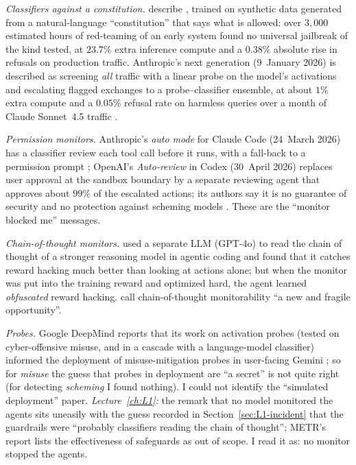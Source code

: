 \begin{beyond}\label{box:L6-monitors}
\emph{Classifiers against a constitution.} \citet{sharma2025} describe , trained on synthetic data generated from a natural-language ``constitution'' that says what is allowed: over $3{,}000$ estimated hours of red-teaming of an early system found no universal jailbreak of the kind tested, at $23.7\%$ extra inference compute and a $0.38\%$ absolute rise in refusals on production traffic. Anthropic's next generation (9~January 2026) is described as screening \emph{all} traffic with a linear probe on the model's activations and escalating flagged exchanges to a probe--classifier ensemble, at about $1\%$ extra compute and a $0.05\%$ refusal rate on harmless queries over a month of Claude Sonnet~4.5 traffic \citep{anthropic2026nextclf}.

\emph{Permission monitors.} Anthropic's \emph{auto mode} for Claude Code (24~March 2026) has a classifier review each tool call before it runs, with a fall-back to a permission prompt \citep{anthropic2026auto}; OpenAI's \emph{Auto-review} in Codex (30~April 2026) replaces user approval at the sandbox boundary by a separate reviewing agent that approves about $99\%$ of the escalated actions; its authors say it is no guarantee of security and no protection against scheming models \citep{trebacz2026}. These are the ``monitor blocked me'' messages.

\emph{Chain-of-thought monitors.} \citet{baker2025} used a separate LLM (GPT-4o) to read the chain of thought of a stronger reasoning model in agentic coding and found that it catches reward hacking much better than looking at actions alone; but when the monitor was put into the training reward and optimized hard, the agent learned \emph{obfuscated} reward hacking. \citet{korbak2025} call chain-of-thought monitorability ``a new and fragile opportunity''.

\emph{Probes.} Google DeepMind reports that its work on activation probes (tested on cyber-offensive misuse, and in a cascade with a language-model classifier) informed the deployment of misuse-mitigation probes in user-facing Gemini \citep{kramar2026}; so for \emph{misuse} the guess that probes in deployment are ``a secret'' is not quite right (for detecting \emph{scheming} I found nothing). I could not identify the ``simulated deployment'' paper. \emph{Lecture~\ref{ch:L1}:} the remark that no model monitored the agents sits uneasily with the guess recorded in Section~\ref{sec:L1-incident} that the guardrails were ``probably classifiers reading the chain of thought''; METR's report lists the effectiveness of safeguards as out of scope. I read it as: no monitor stopped the agents.
\end{beyond}

